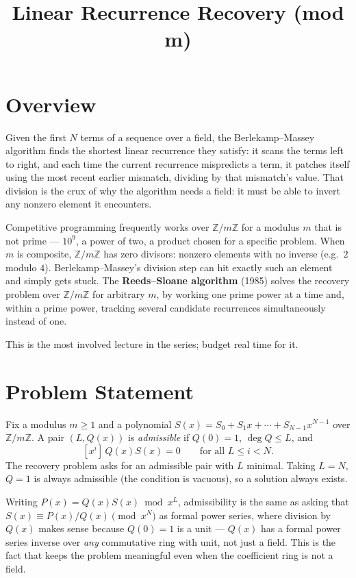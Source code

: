 \documentclass[11pt]{article}
\title{Linear Recurrence Recovery (mod m)}
\author{}
\date{}
\begin{document}
\thispagestyle{fancy}


\section{Overview}
Given the first $N$ terms of a sequence over a field, the Berlekamp--Massey
algorithm finds the shortest linear recurrence they satisfy: it scans the
terms left to right, and each time the current recurrence mispredicts a
term, it patches itself using the most recent earlier mismatch, dividing by
that mismatch's value. That division is the crux of why the algorithm needs
a field: it must be able to invert any nonzero element it encounters.

Competitive programming frequently works over $\mathbb{Z}/m\mathbb{Z}$ for a
modulus $m$ that is not prime --- $10^9$, a power of two, a product chosen
for a specific problem. When $m$ is composite, $\mathbb{Z}/m\mathbb{Z}$ has
zero divisors: nonzero elements with no inverse (e.g.\ $2$ modulo $4$).
Berlekamp--Massey's division step can hit exactly such an element and simply
gets stuck. The \textbf{Reeds--Sloane algorithm} (1985) solves the recovery
problem over $\mathbb{Z}/m\mathbb{Z}$ for arbitrary $m$, by working one prime
power at a time and, within a prime power, tracking several candidate
recurrences simultaneously instead of one.

This is the most involved lecture in the series; budget real time for it.

\section{Problem Statement}

\begin{definitionbox}
Fix a modulus $m \ge 1$ and a polynomial $S(x) = S_0 + S_1 x + \cdots +
S_{N-1}x^{N-1}$ over $\mathbb{Z}/m\mathbb{Z}$. A pair $(L, Q(x))$ is
\emph{admissible} if $Q(0) = 1$, $\deg Q \le L$, and
\[
  [x^i]\, Q(x) S(x) = 0 \qquad \text{for all } L \le i < N .
\]
The recovery problem asks for an admissible pair with $L$ minimal. Taking
$L = N$, $Q = 1$ is always admissible (the condition is vacuous), so a
solution always exists.
\end{definitionbox}

Writing $P(x) = Q(x)S(x) \bmod x^L$, admissibility is the same as asking that
$S(x) \equiv P(x)/Q(x) \pmod{x^N}$ as formal power series, where division by
$Q(x)$ makes sense because $Q(0) = 1$ is a unit --- $Q(x)$ has a formal power
series inverse over \emph{any} commutative ring with unit, not just a field.
This is the fact that keeps the problem meaningful even when the coefficient
ring is not a field.
\end{document}

